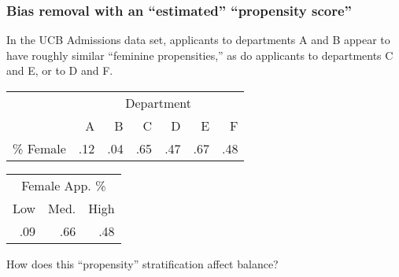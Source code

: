 \begin{frame}
\frametitle{Bias removal with an ``estimated'' ``propensity
score''}

In the UCB Admissions data set, applicants to departments A and B
appear to have roughly similar ``feminine propensities,'' as do
applicants to departments C and E, or to D and F.

{
 \begin{tabular}[b]{|l|rrrrrr|} \hline
& \multicolumn{6}{|c|}{Department} \\
&   A &   B &   C &   D &   E &   F \\ \hline
\% Female & .12 & .04 & .65 & .47 & .67 & .48 \\ \hline
\end{tabular}
 \pause
 \begin{tabular}[b]{rrr|} \hline
  \multicolumn{3}{c|}{Female App. \%}\\
  Low & Med. & High \\ \hline
  .09 & .66 & .48 \\ \hline
\end{tabular}
}

How does this ``propensity'' stratification affect balance?
\end{frame}

